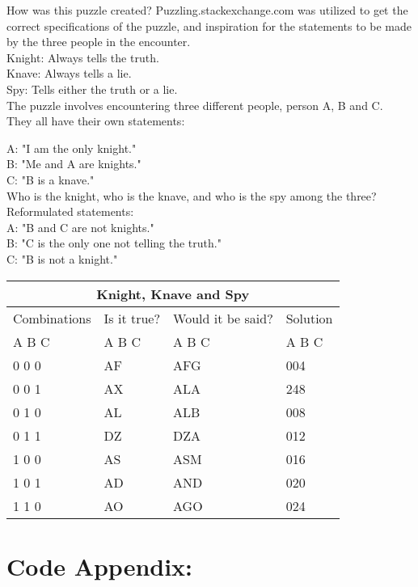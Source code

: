 \documentclass[11pt]{amsart}
\begin{document}
How was this puzzle created?
	Puzzling.stackexchange.com was utilized to get the correct specifications of the puzzle,
	and inspiration for the statements to be made by the three people in the encounter. \\

Knight: Always tells the truth.\\
Knave: 	Always tells a lie.\\
Spy: 		Tells either the truth or a lie. \\

The puzzle involves encountering three different people, person A, B and C. \\

They all have their own statements:

	A: "I am the only knight."\\
	B: "Me and A are knights."\\
	C: "B is a knave." \\

Who is the knight, who is the knave, and who is the spy among the three? \\


Reformulated statements:\\

	A: "B and C are not knights."\\
	B: "C is the only one not telling the truth."\\
	C: "B is not a knight." \\



	\begin{tabular}{ |p{3cm}||p{3cm}|p{3cm}|p{3cm}|  }
	 \hline
	 \multicolumn{4}{|c|}{Knight, Knave and Spy} \\
	 \hline
	 Combinations & Is it true? & Would it be said? & Solution  \\ A  B  C   &   A  B  C  &   A  B  C & A  B  C \\
	 \hline
	 0  0  0   & AF    &AFG&   004\\
	 0  0  1&   AX  & ALA   &248\\
	 0  1  0 &AL & ALB&  008\\
	 0  1  1    &DZ & DZA&  012\\
	 1  0  0&   AS  & ASM&016\\
	 1  0  1& AD  & AND   &020\\
	 1  1  0& AO  & AGO&024\\
	 
	 \hline
	\end{tabular}


\section{Code Appendix:}

\begin{verbatim}



\end{verbatim}
\end{document}
